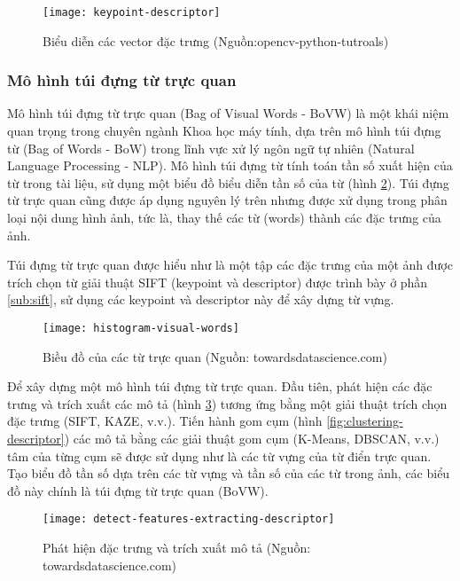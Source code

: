 \begin{figure}[h]
	\centering
	\texttt{[image: keypoint-descriptor]}
	\caption[Biểu diễn các vector đặc trưng]{Biểu diễn các vector đặc trưng (Nguồn:opencv-python-tutroals)}
	\label{fig:kd}
\end{figure}	


\subsubsection{Mô hình túi đựng từ trực quan}
Mô hình túi đựng từ trực quan (Bag of Visual Words - BoVW) là một khái niệm quan trọng trong chuyên ngành Khoa học máy tính, dựa trên mô hình túi đựng từ (Bag of Words - BoW) trong lĩnh vực xử lý ngôn ngữ tự nhiên (Natural Language Processing - NLP). Mô hình túi đựng từ tính toán tần số xuất hiện của từ trong tài liệu, sử dụng một biểu đồ biểu diễn tần số của từ (hình \ref{fig:histogram-visual-words}). Túi đựng từ trực quan cũng được áp dụng nguyên lý trên nhưng được xử dụng trong phân loại nội dung hình ảnh, tức là, thay thế các từ (words) thành các đặc trưng của ảnh.\par

Túi đựng từ trực quan được hiểu như là một tập các đặc trưng của một ảnh được trích chọn từ giải thuật SIFT (keypoint và descriptor) được trình bày ở phần \ref{sub:sift}, sử dụng các keypoint và descriptor này để xây dựng từ vựng.\par

\begin{figure}[h]
	\centering
	\texttt{[image: histogram-visual-words]}
	\caption[Biều đồ của các từ trực quan]{Biều đồ của các từ trực quan (Nguồn: towardsdatascience.com)}
	\label{fig:histogram-visual-words}
\end{figure}	

Để xây dựng một mô hình túi đựng từ trực quan. Đầu tiên, phát hiện các đặc trưng và trích xuất các mô tả (hình \ref{fig:detect-features-extracting-descriptor}) tương ứng bằng một giải thuật trích chọn đặc trưng (SIFT, KAZE, v.v.). Tiến hành gom cụm (hình \ref{fig:clustering-descriptor}) các mô tả bằng các giải thuật gom cụm (K-Means, DBSCAN, v.v.) tâm của từng cụm sẽ được sử dụng như là các từ vựng của từ điển trực quan. Tạo biểu đồ tần số dựa trên các từ vựng và tần số của các từ trong ảnh, các biểu đồ này chính là túi đựng từ trực quan (BoVW).

\begin{figure}[h]
	\centering
	\texttt{[image: detect-features-extracting-descriptor]}
	\caption[Phát hiện đặc trưng và trích xuất mô tả]{Phát hiện đặc trưng và trích xuất mô tả (Nguồn: towardsdatascience.com)}
	\label{fig:detect-features-extracting-descriptor}
\end{figure}

